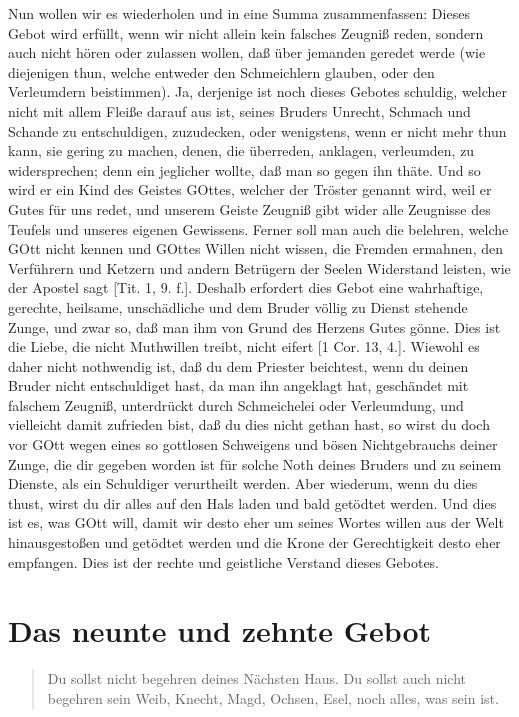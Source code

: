 Nun wollen wir es wiederholen und in eine Summa zusammenfassen: Dieses Gebot wird erfüllt, wenn wir nicht allein kein falsches Zeugniß reden, sondern auch nicht hören oder zulassen wollen, daß über jemanden geredet werde (wie diejenigen thun, welche entweder den Schmeichlern glauben, oder den Verleumdern beistimmen). Ja, derjenige ist noch dieses Gebotes schuldig, welcher nicht mit allem Fleiße darauf aus ist, seines Bruders Unrecht, Schmach und Schande zu entschuldigen, zuzudecken, oder wenigstens, wenn er nicht mehr thun kann, sie gering zu machen, denen, die überreden, anklagen, verleumden, zu widersprechen; denn ein jeglicher wollte, daß man so gegen ihn thäte. Und so wird er ein Kind des Geistes GOttes, welcher der Tröster genannt wird, weil er Gutes für uns redet, und unserem Geiste Zeugniß gibt wider alle Zeugnisse des Teufels und unseres eigenen Gewissens. Ferner soll man auch die belehren, welche GOtt nicht kennen und GOttes Willen nicht wissen, die Fremden ermahnen, den Verführern und Ketzern und andern Betrügern der Seelen Widerstand leisten, wie der Apostel sagt [Tit. 1, 9. f.]. Deshalb erfordert dies Gebot eine wahrhaftige, gerechte, heilsame, unschädliche und dem Bruder völlig zu Dienst stehende Zunge, und zwar so, daß man ihm von Grund des Herzens Gutes gönne. Dies ist die Liebe, die nicht Muthwillen treibt, nicht eifert [1 Cor. 13, 4.]. Wiewohl es daher nicht nothwendig ist, daß du dem Priester beichtest, wenn du deinen Bruder nicht entschuldiget hast, da man ihn angeklagt hat, geschändet mit falschem Zeugniß, unterdrückt durch Schmeichelei oder Verleumdung, und vielleicht damit zufrieden bist, daß du dies nicht gethan hast, so wirst du doch vor GOtt wegen eines so gottlosen Schweigens und bösen Nichtgebrauchs deiner Zunge, die dir gegeben worden ist für solche Noth deines Bruders und zu seinem Dienste, als ein Schuldiger verurtheilt werden. Aber wiederum, wenn du dies thust, wirst du dir alles auf den Hals laden und bald getödtet werden. Und dies ist es, was GOtt will, damit wir desto eher um seines Wortes willen aus der Welt hinausgestoßen und getödtet werden und die Krone der Gerechtigkeit desto eher empfangen. Dies ist der rechte und geistliche Verstand dieses Gebotes.

\section{Das neunte und zehnte Gebot}

\begin{quote}
Du sollst nicht begehren deines Nächsten Haus. Du sollst auch nicht begehren sein Weib, Knecht, Magd, Ochsen, Esel, noch alles, was sein ist.
\end{quote}

